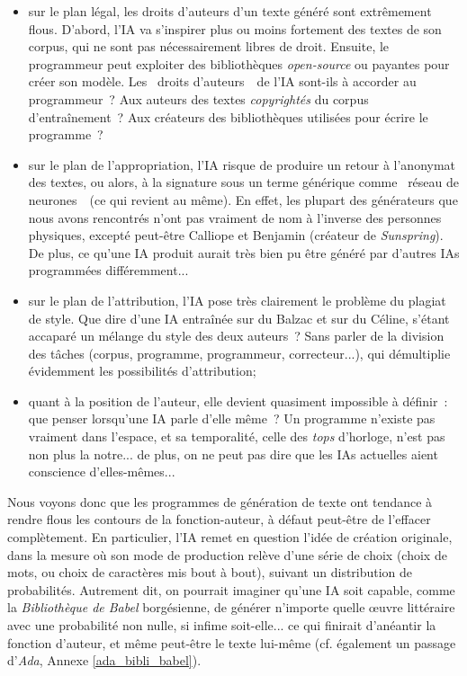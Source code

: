 \documentclass{article}
\begin{document}
					\begin{itemize}
						\item sur le plan légal, les droits d'auteurs d'un texte généré sont extrêmement flous. D'abord, l'IA va s'inspirer plus ou moins fortement des textes de son corpus, qui ne sont pas nécessairement libres de droit. Ensuite, le programmeur peut exploiter des bibliothèques \textit{open-source} ou payantes pour créer son modèle. Les \guillemotleft~droits d'auteurs~\guillemotright~de l'IA sont-ils à accorder au programmeur~? Aux auteurs des textes \textit{copyrightés} du corpus d'entraînement~? Aux créateurs des bibliothèques utilisées pour écrire le programme~?
						\item sur le plan de l'appropriation, l'IA risque de produire un retour à l'anonymat des textes, ou alors, à la signature sous un terme générique comme \guillemotleft~réseau de neurones~\guillemotright~(ce qui revient au même). En effet, les plupart des générateurs que nous avons rencontrés n'ont pas vraiment de nom à l'inverse des personnes physiques, excepté peut-être Calliope et Benjamin (créateur de \textit{Sunspring}). De plus, ce qu'une IA produit aurait très bien pu être généré par d'autres IAs programmées différemment...
						\item sur le plan de l'attribution, l'IA pose très clairement le problème du plagiat de style. Que dire d'une IA entraînée sur du Balzac et sur du Céline, s'étant accaparé un mélange du style des deux auteurs~? Sans parler de la division des tâches (corpus, programme, programmeur, correcteur...), qui démultiplie évidemment les possibilités d'attribution;
						\item quant à la position de l'auteur, elle devient quasiment impossible à définir~: que penser lorsqu'une IA parle d'elle même~? Un programme n'existe pas vraiment dans l'espace, et sa temporalité, celle des \textit{tops} d'horloge, n'est pas non plus la notre... de plus, on ne peut pas dire que les IAs actuelles aient conscience d'elles-mêmes...
					\end{itemize}
					\vspace{2mm}
					Nous voyons donc que les programmes de génération de texte ont tendance à rendre flous les contours de la fonction-auteur, à défaut peut-être de l'effacer complètement. En particulier, l'IA remet en question l'idée de création originale, dans la mesure où son mode de production relève d'une série de choix (choix de mots, ou choix de caractères mis bout à bout), suivant un distribution de probabilités. Autrement dit, on pourrait imaginer qu'une IA soit capable, comme la \textit{Bibliothèque de Babel} borgésienne, de générer n'importe quelle œuvre littéraire avec une probabilité non nulle, si infime soit-elle... ce qui finirait d'anéantir la fonction d'auteur, et même peut-être le texte lui-même (cf. également un passage d'\textit{Ada}, Annexe \ref{ada_bibli_babel}).
\end{document}
